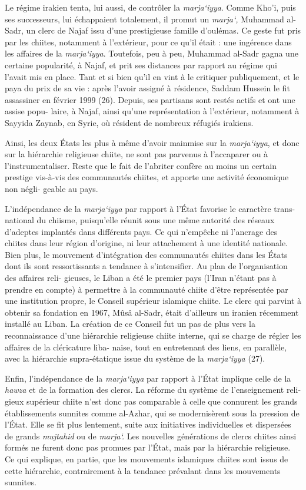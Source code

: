 Le régime irakien tenta, lui aussi, de contrôler la \emph{marja`iyya}.
Comme Kho'i, puis ses successeurs, lui échappaient totalement, il promut
un \emph{marja`,} Muhammad al-Sadr, un clerc de Najaf issu d'une
prestigieuse famille d'oulémas. Ce geste fut pris par les chiites,
notamment à l'extérieur, pour ce qu'il était : une ingérence dans les
affaires de la \emph{marja`iyya}. Toutefois, peu à peu, Muhammad al-Sadr
gagna une certaine popularité, à Najaf, et prit ses distances par
rapport au régime qui l'avait mis en place. Tant et si bien qu'il en
vint à le critiquer publiquement, et le paya du prix de sa vie : après
l'avoir assigné à résidence, Saddam Hussein le fit assassiner en février
1999 (26). Depuis, ses partisans sont restés actifs et ont une assise
popu- laire, à Najaf, ainsi qu'une représentation à l'extérieur,
notamment à Sayyida Zaynab, en Syrie, où résident de nombreux réfugiés
irakiens.

Ainsi, les deux États les plus à même d'avoir mainmise sur la
\emph{marja`iyya}, et donc sur la hiérarchie religieuse chiite, ne sont
pas parvenus à l'accaparer ou à l'instrumentaliser. Reste que le fait de
l'abriter confère au moins un certain prestige vis-à-vis des communautés
chiites, et apporte une activité économique non négli- geable au pays.

L'indépendance de la \emph{marja`iyya} par rapport à l'État favorise le
caractère trans- national du chiisme, puisqu'elle réunit sous une même
autorité des réseaux d'adeptes implantés dans différents pays. Ce qui
n'empêche ni l'ancrage des chiites
dans leur région d'origine, ni leur attachement à une identité
nationale. Bien plus, le mouvement d'intégration des communautés chiites
dans les États dont ils sont ressortissants a tendance à s'intensifier.
Au plan de l'organisation des affaires reli- gieuses, le Liban a été le
premier pays (l'Iran n'étant pas à prendre en compte) à permettre à la
communauté chiite d'être représentée par une institution propre, le
Conseil supérieur islamique chiite. Le clerc qui parvint à obtenir sa
fondation en 1967, Mûsâ al-Sadr, était d'ailleurs un iranien récemment
installé au Liban. La création de ce Conseil fut un pas de plus vers la
reconnaissance d'une hiérarchie religieuse chiite interne, qui se charge
de régler les affaires de la cléricature liba- naise, tout en
entretenant des liens, en parallèle, avec la hiérarchie supra-étatique
issue du système de la \emph{marja`iyya} (27).

Enfin, l'indépendance de la \emph{marja`iyya} par rapport à l'État
implique celle de la \emph{hawza} et de la formation des clercs. La
réforme du système de l'enseignement reli- gieux supérieur chiite n'est
donc pas comparable à celle que connurent les grands établissements
sunnites comme al-Azhar, qui se modernisèrent sous la pression de
l'État. Elle se fit plus lentement, suite aux initiatives individuelles
et dispersées de grands \emph{mujtahid} ou de \emph{marja`.} Les
nouvelles générations de clercs chiites ainsi formés ne furent donc pas
promues par l'État, mais par la hiérarchie religieuse. Ce qui explique,
en partie, que les mouvements islamiques chiites sont issus de cette
hiérarchie, contrairement à la tendance prévalant dans les mouvements
sunnites.

